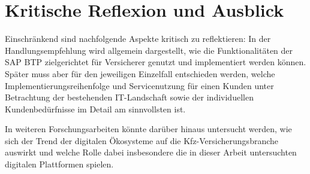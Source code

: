 \section{Kritische Reflexion und Ausblick}

Einschränkend sind nachfolgende Aspekte kritisch zu reflektieren: In der Handlungsempfehlung wird allgemein dargestellt, wie die Funktionalitäten der SAP BTP zielgerichtet für Versicherer genutzt und implementiert werden können. Später muss aber für den jeweiligen Einzelfall entschieden werden, welche Implementierungsreihenfolge und Servicenutzung für einen Kunden unter Betrachtung der bestehenden IT-Landschaft sowie der individuellen Kundenbedürfnisse im Detail am sinnvollsten ist.

In weiteren Forschungsarbeiten könnte darüber hinaus untersucht werden, wie sich der Trend der digitalen Ökosysteme auf die Kfz-Versicherungsbranche auswirkt und welche Rolle dabei insbesondere die in dieser Arbeit untersuchten digitalen Plattformen spielen.







